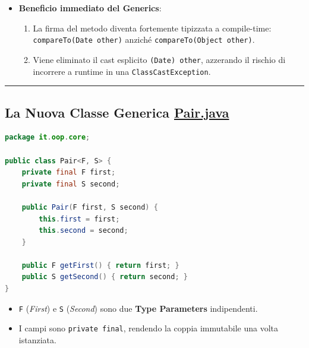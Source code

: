 \documentclass[11pt,a4paper,oneside]{report}
\newcommand{\passthrough}[1]{#1}
\providecommand{\tightlist}{\setlength{\itemsep}{0pt}\setlength{\parskip}{0pt}}
\begin{document}
\begin{itemize}
\tightlist
\item
  \textbf{Beneficio immediato del Generics}:

  \begin{enumerate}
  \def\labelenumi{\arabic{enumi}.}
  \tightlist
  \item
    La firma del metodo diventa fortemente tipizzata a compile-time:
    \passthrough{\lstinline!compareTo(Date other)!} anziché
    \passthrough{\lstinline!compareTo(Object other)!}.
  \item
    Viene eliminato il cast esplicito
    \passthrough{\lstinline!(Date) other!}, azzerando il rischio di
    incorrere a runtime in una
    \passthrough{\lstinline!ClassCastException!}.
  \end{enumerate}
\end{itemize}

\begin{center}\rule{0.5\linewidth}{0.5pt}\end{center}

\subsection{\texorpdfstring{La Nuova Classe Generica
\href{file:///home/wally/Documenti/GitHub/Programmazione-II/25-26/Teoria-e-Esercitazioni/Codice-20260902/Lezione14/MavenDate/src/main/java/it/oop/core/Pair.java}{Pair.java}}{La Nuova Classe Generica Pair.java}}\label{chap13_la-nuova-classe-generica-pair.java}

\begin{lstlisting}[language=Java]
package it.oop.core;

public class Pair<F, S> {
    private final F first;
    private final S second;

    public Pair(F first, S second) {
        this.first = first;
        this.second = second;
    }

    public F getFirst() { return first; }
    public S getSecond() { return second; }
}
\end{lstlisting}

\begin{itemize}
\tightlist
\item
  \passthrough{\lstinline!F!} (\emph{First}) e
  \passthrough{\lstinline!S!} (\emph{Second}) sono due \textbf{Type
  Parameters} indipendenti.
\item
  I campi sono \passthrough{\lstinline!private final!}, rendendo la
  coppia immutabile una volta istanziata.
\end{itemize}
\end{document}
